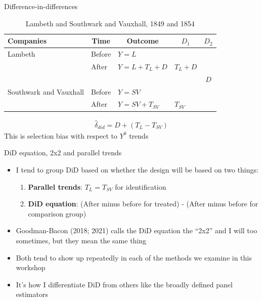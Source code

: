 \documentclass{beamer}
\begin{document}
\begin{frame}{Difference-in-differences}

\begin{table}\centering
		\caption{Lambeth and Southwark and Vauxhall, 1849 and 1854}
		\begin{center}
		\begin{tabular}{lll|lc}
		\toprule
		\multicolumn{1}{l}{\textbf{Companies}}&
		\multicolumn{1}{c}{\textbf{Time}}&
		\multicolumn{1}{c}{\textbf{Outcome}}&
		\multicolumn{1}{c}{$D_1$}&
		\multicolumn{1}{c}{$D_2$}\\
		\midrule
		Lambeth & Before & $Y=L$ \\
		& After & $Y=L + T_L + D$ & $T_L+D$\\
		\midrule
		& & & & $D$ \\
		\midrule
		Southwark and Vauxhall & Before & $Y=SV$ \\
		& After & $Y=SV + T_{SV}$ & $T_{SV}$\\
		\bottomrule
		\end{tabular}
		\end{center}
	\end{table}

\begin{eqnarray*}
\widehat{\delta}_{did} = D + (T_L - T_{SV})
\end{eqnarray*}This is selection bias with respect to $Y^0$ trends

\end{frame}

\begin{frame}{DiD equation, 2x2 and parallel trends}

\begin{itemize}
\item I tend to group DiD based on whether the design will be based on two things:
	\begin{enumerate}
	\item \textbf{Parallel trends}: $T_L = T_{SV}$ for identification
	\item \textbf{DiD equation}: (After minus before for treated) - (After minus before for comparison group)
	\end{enumerate}
\item Goodman-Bacon (2018; 2021) calls the DiD equation the ``2x2'' and I will too sometimes, but they mean the same thing
\item Both tend to show up repeatedly in each of the methods we examine in this workshop
\item It's how I differentiate DiD from others like the broadly defined panel estimators
\end{itemize}

\end{frame}
\end{document}
